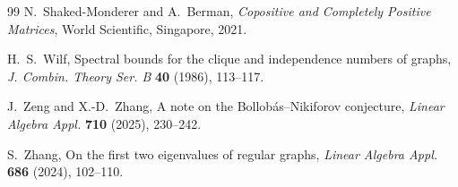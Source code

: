 \documentclass[11pt]{article}
\theoremstyle{remark}
\begin{document}
\begin{thebibliography}{99}
N.~Shaked-Monderer and A.~Berman,
\emph{Copositive and Completely Positive Matrices},
World Scientific, Singapore, 2021.

H.~S.~Wilf,
Spectral bounds for the clique and independence numbers of graphs,
\emph{J. Combin. Theory Ser. B} \textbf{40} (1986), 113--117.

J.~Zeng and X.-D.~Zhang,
A note on the Bollob\'as--Nikiforov conjecture,
\emph{Linear Algebra Appl.} \textbf{710} (2025), 230--242.

S.~Zhang,
On the first two eigenvalues of regular graphs,
\emph{Linear Algebra Appl.} \textbf{686} (2024), 102--110.

\end{thebibliography}
\end{document}
